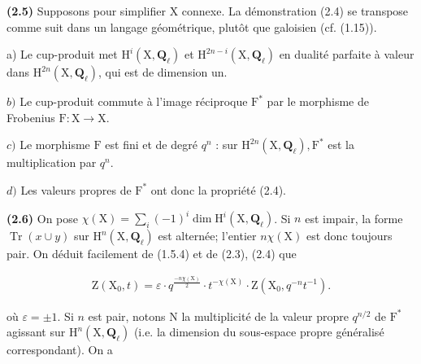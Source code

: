 \documentclass[10pt,leqno]{article}
\begin{document}
\noindent \textbf{(2.5)} Supposons pour simplifier \(\mathrm{X}\) connexe. La démonstration (2.4) se transpose comme suit dans un langage géométrique, plutôt que galoisien (cf. (1.15)).\par

\noindent a) Le cup-produit met \(\mathrm{H}^{i}(\mathrm{X},\mathbf{Q}_{\ell })\) et \(\mathrm{H}^{2n- i}(\mathrm{X},\mathbf{Q}_{\ell })\) en dualité parfaite à valeur dans \(\mathrm{H}^{2n}(\mathrm{X},\mathbf{Q}_{\ell })\), qui est de dimension un.\par

\noindent \(b)\) Le cup-produit commute à l’image réciproque \(\mathrm{F}^{*}\) par le morphisme de Frobenius \(\mathrm{F} : \mathrm{X}\longrightarrow \mathrm{X}\).\par

\noindent \(c)\) Le morphisme \(\mathrm{F}\) est fini et de degré \(q^{n}\) : sur \(\mathrm{H}^{2n}(\mathrm{X},\mathbf{Q}_{\ell }), \mathrm{F}^{*}\) est la multiplication par \(q^{n}\).\par

\noindent \(d)\) Les valeurs propres de \(\mathrm{F}^{*}\) ont donc la propriété (2.4).\par

\noindent \textbf{(2.6)} On pose \(\chi (\mathrm{X})=\sum _{i}(- 1)^{i} \operatorname{dim} \mathrm{H}^{i}(\mathrm{X},\mathbf{Q}_{\ell })\). Si \(n\) est impair, la forme \(\operatorname{Tr}(x\cup y)\) sur \(\mathrm{H}^{n}(\mathrm{X},\mathbf{Q}_{\ell })\) est alternée; l’entier \(n\chi (\mathrm{X})\) est donc toujours pair. On déduit facilement de (1.5.4) et de (2.3), (2.4) que\par

\begin{equation*}\begin{gathered}\mathrm{Z}(\mathrm{X}_{0},t) = \varepsilon \cdot q^{\frac{-n\chi(\mathrm{X})}{2}}\cdot t^{- \chi (\mathrm{X})}\cdot \mathrm{Z}(\mathrm{X}_{0},q^{- n}t^{- 1}).\end{gathered}\end{equation*}

\clearpage

\label{physical-11}\par\smallskip

\noindent où \(\varepsilon =\pm 1\). Si \(n\) est pair, notons \(\mathrm{N}\) la multiplicité de la valeur propre \(q^{n/2}\) de \(\mathrm{F}^{*}\) agissant sur \(\mathrm{H}^{n}(\mathrm{X},\mathbf{Q}_{\ell })\) (i.e. la dimension du sous-espace propre généralisé correspondant). On a\par
\end{document}
